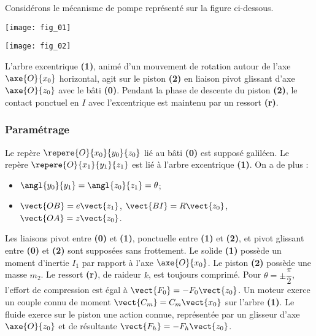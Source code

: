 \ifprof
\else
\begin{multicols}{2}
\fi


\ifprof
\else

Considérons le mécanisme de pompe représenté sur la figure ci-dessous.

\begin{center}
\texttt{[image: fig\_01]}
\end{center}


\begin{center}
\texttt{[image: fig\_02]}
\end{center}

L'arbre excentrique \textbf{(1)}, animé d'un mouvement de rotation autour de l'axe $\axe{O}{x_0}$  horizontal, agit sur le piston \textbf{(2)} en liaison pivot glissant d'axe $\axe{O}{z_0}$ avec le bâti \textbf{(0)}. Pendant la phase de descente du piston \textbf{(2)}, le contact ponctuel en $I$ avec l’excentrique est maintenu par un ressort \textbf{(r)}.

\subsubsection*{Paramétrage}
Le repère $\repere{O}{x_0}{y_0}{z_0}$ lié au bâti \textbf{(0)} est supposé galiléen.
Le repère $\repere{O}{x_1}{y_1}{z_1}$ est lié à l'arbre excentrique \textbf{(1)}.
On a de plus :

\begin{itemize}
\item $\angl{y_0}{y_1}=\angl{z_0}{z_1}=\theta$;
\item $\vect{OB}=e\vect{z_1}$, $\vect{BI}=R\vect{z_0}$, $\vect{OA}=z\vect{z_0}$. 
\end{itemize} 	 	 		
 
Les liaisons pivot entre \textbf{(0)} et \textbf{(1)}, ponctuelle entre \textbf{(1)} et \textbf{(2)}, et pivot glissant entre \textbf{(0)} et \textbf{(2)} sont supposées sans frottement.
Le solide \textbf{(1)} possède un moment d’inertie $I_1$ par rapport à l'axe $\axe{O}{x_0}$. Le piston \textbf{(2)} possède une masse $m_2$.
Le ressort \textbf{(r)}, de raideur $k$, est toujours comprimé. Pour $\theta = \pm \dfrac{\pi}{2}$, l'effort de compression est égal à $\vect{F_0}=-F_0\vect{z_0}$.
Un moteur exerce un couple connu de moment $\vect{C_m}=C_m\vect{x_0}$ sur l'arbre \textbf{(1)}. Le fluide exerce sur le piston une action connue, représentée par un glisseur d'axe $\axe{O}{z_0}$ et de résultante $\vect{F_h}=-F_h{\vect{z_0}}$.


\end{multicols}
